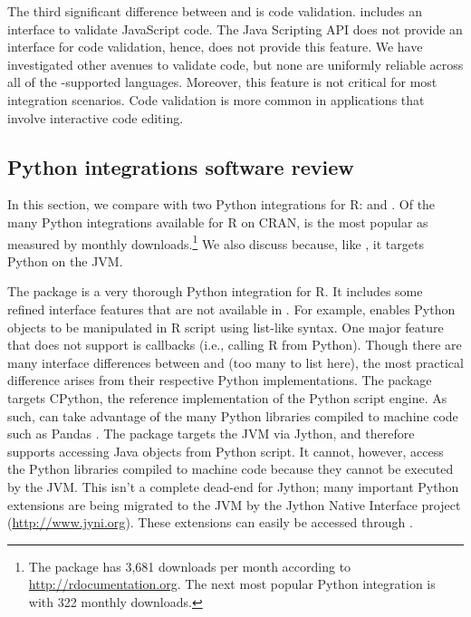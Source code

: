 The third significant difference between  and  is code validation.  includes an interface to validate JavaScript code. The Java Scripting API does not provide an interface for code validation, hence,  does not provide this feature. We have investigated other avenues to validate code, but none are uniformly reliable across all of the -supported languages. Moreover, this feature is not critical for most integration scenarios. Code validation is more common in applications that involve interactive code editing.

\hypertarget{python-integrations}{}
\subsection{Python integrations software review}

In this section, we compare  with two Python integrations for R:  \citep{reticulate} and  \citep{rjython}. Of the many Python integrations available for R on CRAN,  is the most popular as measured by monthly downloads.\footnote{The  package has 3,681 downloads per month according to \url{http://rdocumentation.org}. The next most popular Python integration is  \citep{pythoninr} with 322 monthly downloads.} We also discuss  because, like , it targets Python on the JVM.

The  package is a very thorough Python integration for R. It includes some refined interface features that are not available in . For example,  enables Python objects to be manipulated in R script using list-like syntax. One major  feature that  does not support is callbacks (i.e., calling R from Python). Though there are many interface differences between  and  (too many to list here), the most practical difference arises from their respective Python implementations. The  package targets CPython, the reference implementation of the Python script engine. As such,  can take advantage of the many Python libraries compiled to machine code such as Pandas \citep{pandas}. The  package targets the JVM via Jython, and therefore supports accessing Java objects from Python script. It cannot, however, access the Python libraries compiled to machine code because they cannot be executed by the JVM. This isn't a complete dead-end for Jython; many important Python extensions are being migrated to the JVM by the Jython Native Interface project (\url{http://www.jyni.org}). These extensions can easily be accessed through .

